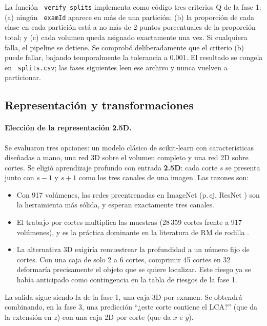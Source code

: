 \documentclass[12pt,letterpaper]{article}
\newcommand{\code}[1]{\texttt{\hyphenchar\font=-1 #1}}
\begin{document}
\noindent La función \code{verify\_splits} implementa como código tres criterios Q de la fase 1: (a) ningún \code{examId} aparece en más de una partición; (b) la proporción de cada clase en cada partición está a no más de 2 puntos porcentuales de la proporción total; y (c) cada volumen queda asignado exactamente una vez. Si cualquiera falla, el pipeline se detiene. Se comprobó deliberadamente que el criterio (b) puede fallar, bajando temporalmente la tolerancia a 0.001. El resultado se congela en \code{splits.csv}; las fases siguientes leen ese archivo y nunca vuelven a particionar.

\subsection{Representación y transformaciones}\label{sec:transformaciones}

\paragraph{Elección de la representación 2.5D.} Se evaluaron tres opciones: un modelo clásico de scikit-learn con características diseñadas a mano, una red 3D sobre el volumen completo y una red 2D sobre cortes. Se eligió aprendizaje profundo con entrada \textbf{2.5D}: cada corte $s$ se presenta junto con $s-1$ y $s+1$ como los tres canales de una imagen. Las razones son:

\begin{itemize}[leftmargin=*]
  \item Con 917 volúmenes, las redes preentrenadas en ImageNet (p.\,ej. ResNet \cite{he2016resnet}) son la herramienta más sólida, y esperan exactamente tres canales.
  \item El trabajo por cortes multiplica las muestras (28\,359 cortes frente a 917 volúmenes), y es la práctica dominante en la literatura de RM de rodilla \cite{bien2018mrnet}.
  \item La alternativa 3D exigiría remuestrear la profundidad a un número fijo de cortes. Con una caja de solo 2 a 6 cortes, comprimir 45 cortes en 32 deformaría precisamente el objeto que se quiere localizar. Este riesgo ya se había anticipado como contingencia en la tabla de riesgos de la fase 1.
\end{itemize}

\noindent La salida sigue siendo la de la fase 1, una caja 3D por examen. Se obtendrá combinando, en la fase 3, una predicción ``¿este corte contiene el LCA?'' (que da la extensión en $z$) con una caja 2D por corte (que da $x$ e $y$).
\end{document}
